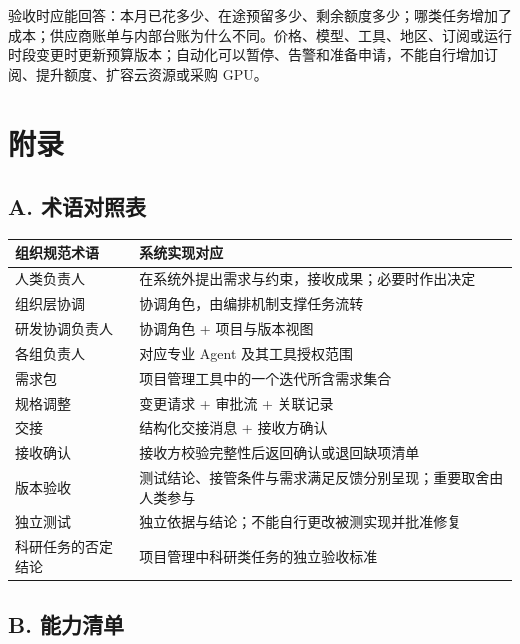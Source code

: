 \documentclass[11pt,a4paper]{article}
\begin{document}
验收时应能回答：本月已花多少、在途预留多少、剩余额度多少；哪类任务增加了成本；供应商账单与内部台账为什么不同。价格、模型、工具、地区、订阅或运行时段变更时更新预算版本；自动化可以暂停、告警和准备申请，不能自行增加订阅、提升额度、扩容云资源或采购 GPU。


\newpage
\section*{附录}

\subsection*{A. 术语对照表}

\begin{table}[H]
\centering\small
\renewcommand{\arraystretch}{1.25}
\begin{tabularx}{\textwidth}{P{3.5cm} L}
\toprule
\textbf{组织规范术语} & \textbf{系统实现对应} \\
\midrule
人类负责人 & 在系统外提出需求与约束，接收成果；必要时作出决定 \\
组织层协调 & 协调角色，由编排机制支撑任务流转 \\
研发协调负责人 & 协调角色 + 项目与版本视图 \\
各组负责人 & 对应专业 Agent 及其工具授权范围 \\
需求包 & 项目管理工具中的一个迭代所含需求集合 \\
规格调整 & 变更请求 + 审批流 + 关联记录 \\
交接 & 结构化交接消息 + 接收方确认 \\
接收确认 & 接收方校验完整性后返回确认或退回缺项清单 \\
版本验收 & 测试结论、接管条件与需求满足反馈分别呈现；重要取舍由人类参与 \\
独立测试 & 独立依据与结论；不能自行更改被测实现并批准修复 \\
科研任务的否定结论 & 项目管理中科研类任务的独立验收标准 \\
\bottomrule
\end{tabularx}
\end{table}

\subsection*{B. 能力清单}
\end{document}

